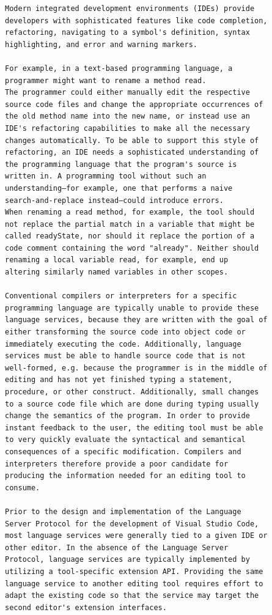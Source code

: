 \begin{verbatim}
Modern integrated development environments (IDEs) provide
developers with sophisticated features like code completion,
refactoring, navigating to a symbol's definition, syntax
highlighting, and error and warning markers.

For example, in a text-based programming language, a
programmer might want to rename a method read.
The programmer could either manually edit the respective
source code files and change the appropriate occurrences of
the old method name into the new name, or instead use an
IDE's refactoring capabilities to make all the necessary
changes automatically. To be able to support this style of
refactoring, an IDE needs a sophisticated understanding of
the programming language that the program's source is
written in. A programming tool without such an
understanding—for example, one that performs a naive
search-and-replace instead—could introduce errors.
When renaming a read method, for example, the tool should
not replace the partial match in a variable that might be
called readyState, nor should it replace the portion of a
code comment containing the word "already". Neither should
renaming a local variable read, for example, end up
altering similarly named variables in other scopes.

Conventional compilers or interpreters for a specific
programming language are typically unable to provide these
language services, because they are written with the goal of
either transforming the source code into object code or
immediately executing the code. Additionally, language
services must be able to handle source code that is not
well-formed, e.g. because the programmer is in the middle of
editing and has not yet finished typing a statement,
procedure, or other construct. Additionally, small changes
to a source code file which are done during typing usually
change the semantics of the program. In order to provide
instant feedback to the user, the editing tool must be able
to very quickly evaluate the syntactical and semantical
consequences of a specific modification. Compilers and
interpreters therefore provide a poor candidate for
producing the information needed for an editing tool to
consume.

Prior to the design and implementation of the Language
Server Protocol for the development of Visual Studio Code,
most language services were generally tied to a given IDE or
other editor. In the absence of the Language Server
Protocol, language services are typically implemented by
utilizing a tool-specific extension API. Providing the same
language service to another editing tool requires effort to
adapt the existing code so that the service may target the
second editor's extension interfaces.


\end{verbatim}
